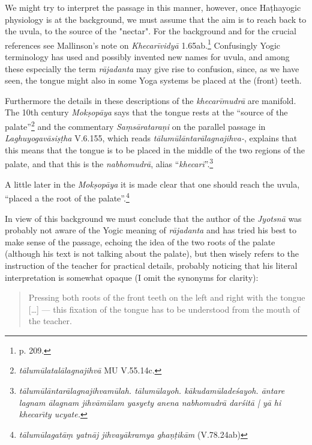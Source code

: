 \begin{ekdosis}
\begin{philcomm}

We might try to interpret the passage in this manner, however, once Haṭhayogic physiology is at the
background, we must assume that the aim is to reach back to the uvula, to the source of the
"nectar".  For the background and for the crucial references see Mallinson's note on
\emph{Khecarīvidyā} 1.65ab.\footnote{p. 209.}  Confusingly Yogic terminology has used and possibly
invented new names for uvula, and among these especially the term \emph{rājadanta} may give rise to
confusion, since, as we have seen, the tongue might also in some Yoga systems be placed at the
(front) teeth.

Furthermore the details in these descriptions of the \emph{khecarīmudrā} are manifold. The 10th
century \emph{Mokṣopāya} says that the tongue rests at the ``source of the
palate''\footnote{\emph{tālumūlatalālagnajihvā} MU V.55.14c.} and the commentary
\emph{Saṃsārataraṇi} on the parallel passage in \emph{Laghuyogavāsiṣṭha} V.6.155, which reads
\emph{tālumūlāntarālagnajihva-}, explains that this means that the tongue is to be placed in the
middle of the two regions of the palate, and that this is the \emph{nabhomudrā}, alias
``\emph{khecarī}''.\footnote{\emph{tālumūlāntarālagnajihvamūlah. tālumūlayoh. kākudamūladeśayoh. āntare
  lagnam ālagnam jihvāmūlam yasyety anena nabhomudrā darśitā | yā hi khecarı̄ty ucyate.}}

A little later in the \emph{Mokṣopāya} it is made clear that one should reach the uvula, ``placed a
the root of the palate''.\footnote{\emph{tālumūlagatāṃ yatnāj jihvayākramya ghaṇṭikām}
(V.78.24ab)}

In view of this background we must conclude that the author of the \emph{Jyotsnā} was probably not
aware of the Yogic meaning of \emph{rājadanta} and has tried his best to make sense of the passage,
echoing the idea of the two roots of the palate (although his text is not talking about the
palate), but then wisely refers to the instruction of the teacher for practical details, probably
noticing that his literal interpretation is somewhat opaque (I omit the synonyms for clarity):

\begin{quote}
Pressing both roots of the front teeth on the left and right with the tongue [\ldots] — this fixation of the tongue has to be understood from the mouth of the teacher.


\end{quote}
\end{philcomm}
\end{ekdosis}
